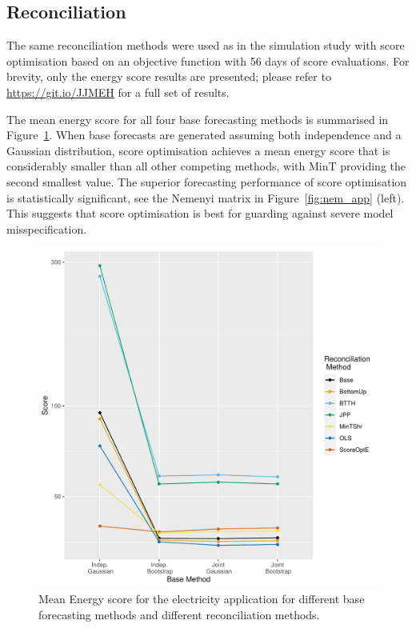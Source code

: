 \documentclass[a4paper,12pt]{article}
\theoremstyle{definition}
\begin{document}
\subsection{Reconciliation}\label{sec:applreco}

The same reconciliation methods were used as in the simulation study with score optimisation based on an objective function with 56 days of score evaluations. For brevity, only the energy score results are presented; please refer to \url{https://git.io/JJMEH} for a full set of results.

The mean energy score for all four base forecasting methods is summarised in Figure~\ref{fig:meanenergy_app}. When base forecasts are generated assuming both independence and a Gaussian distribution, score optimisation achieves a mean energy score that is considerably smaller than all other competing methods, with MinT providing the second smallest value. The superior forecasting performance of score optimisation is statistically significant, see the Nemenyi matrix in Figure~\ref{fig:nem_app} (left). This suggests that score optimisation is best for guarding against severe model misspecification.

\begin{figure}[!htb]
  \centering
  \includegraphics[width=.35\textheight]{Figs/meanenergyscore}
  \caption{Mean Energy score for the electricity application for different base forecasting methods and different reconciliation methods.}\label{fig:meanenergy_app}
\end{figure}
\end{document}
